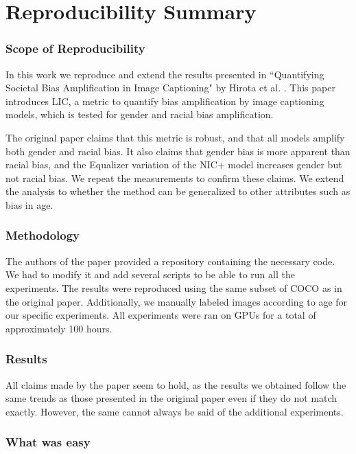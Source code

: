 \section*{\centering Reproducibility Summary}

\subsubsection*{Scope of Reproducibility}

In this work we reproduce and extend the results presented in ``Quantifying Societal Bias Amplification in Image Captioning" by Hirota et al. \cite{Hirota2022}. 
 This paper introduces LIC, a metric to quantify bias amplification by image captioning models, which is tested for gender and racial bias amplification. 

The original paper claims that this metric is robust, and that all models amplify both gender and racial bias. It also claims that gender bias is more apparent than racial bias, and the Equalizer variation of the NIC+ model \cite{Burns2018} increases gender but not racial bias. We repeat the measurements to confirm these claims. We extend the analysis to whether the method can be generalized to other attributes such as bias in age.

\subsubsection*{Methodology}

The authors of the paper provided a repository containing the necessary code. We had to modify it and add several scripts to be able to run all the experiments. The results were reproduced using the same subset of COCO \cite{zhao2021captionbias} as in the original paper. Additionally, we manually labeled images according to age for our specific experiments. All experiments were ran on GPUs for a total of approximately 100 hours.

\subsubsection*{Results}

All claims made by the paper \cite{Hirota2022} seem to hold, as the results we obtained follow the same trends as those presented in the original paper even if they do not match exactly.
However, the same cannot always be said of the additional experiments.

\subsubsection*{What was easy}

